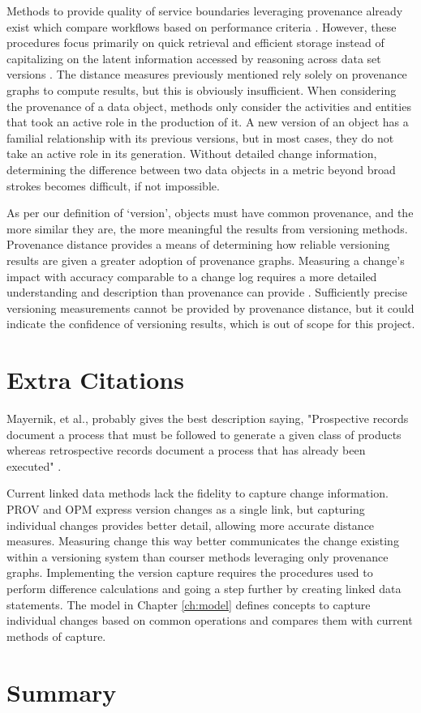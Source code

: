 Methods to provide quality of service boundaries leveraging provenance already exist which compare workflows based on performance criteria \cite{2015:CAA:2778374.2778504}.
However, these procedures focus primarily on quick retrieval and efficient storage instead of capitalizing on the latent information accessed by reasoning across data set versions \cite{tan2004research}.
The distance measures previously mentioned rely solely on provenance graphs to compute results, but this is obviously insufficient.
When considering the provenance of a data object, methods only consider the activities and entities that took an active role in the production of it.
A new version of an object has a familial relationship with its previous versions, but in most cases, they do not take an active role in its generation.
Without detailed change information, determining the difference between two data objects in a metric beyond broad strokes becomes difficult, if not impossible.

As per our definition of `version', objects must have common provenance, and the more similar they are, the more meaningful the results from versioning methods.
Provenance distance provides a means of determining how reliable versioning results are given a greater adoption of provenance graphs.
Measuring a change's impact with accuracy comparable to a change log requires a more detailed understanding and description than provenance can provide  \cite{Bose:2005:LRS:1057977.1057978}.
Sufficiently precise versioning measurements cannot be provided by provenance distance, but it could indicate the confidence of versioning results, which is out of scope for this project.

\section{Extra Citations}

Mayernik, et al., probably gives the best description saying, "Prospective records document a process that must be followed to generate a given class of products whereas retrospective records document a process that has already been executed" \cite{MatthewS.Mayernik201312-039}.


Current linked data methods lack the fidelity to capture change information.
PROV and OPM express version changes as a single link, but capturing individual changes provides better detail, allowing more accurate distance measures.
Measuring change this way better communicates the change existing within a versioning system than courser methods leveraging only provenance graphs.
Implementing the version capture requires the procedures used to perform difference calculations and going a step further by creating linked data statements.
The model in Chapter \ref{ch:model} defines concepts to capture individual changes based on common operations and compares them with current methods of capture.

\section{Summary}
